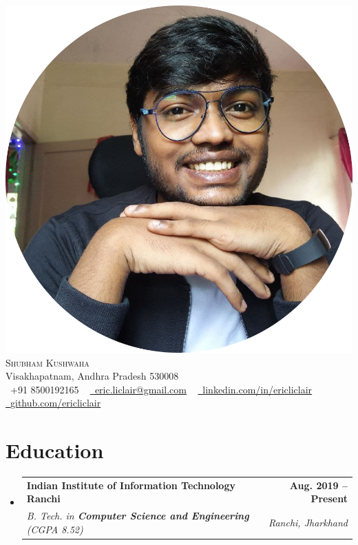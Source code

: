 \documentclass[letterpaper,11pt]{article}
\makeatletter
\newcommand{\resumeSubheading}[4]{
  \vspace{-2pt}\item
    \begin{tabular*}{1.0\textwidth}[t]{l@{\extracolsep{\fill}}r}
      \textbf{#1} & \textbf{\small #2} \\
      \textit{\small#3} & \textit{\small #4} \\
    \end{tabular*}\vspace{-7pt}
}
\newcommand{\resumeSubHeadingListStart}{\begin{itemize}[leftmargin=0.0in, label={}]}
\newcommand{\resumeSubHeadingListEnd}{\end{itemize}}
\makeatother
\begin{document}

\begin{center}
    {\includegraphics[scale=0.05]{images/profile.png}}\\ 
    {\Huge \scshape Shubham Kushwaha} \\ \vspace{1pt}
    Visakhapatnam, Andhra Pradesh 530008 \\ \vspace{1pt}
    \small \raisebox{-0.1\height}\faPhone\ +91 8500192165 ~ \href{mailto:eric.liclair@gmail.com}{\raisebox{-0.2\height}\faEnvelope\  \underline{eric.liclair@gmail.com}} ~ 
    \href{https://linkedin.com/in//}{\raisebox{-0.2\height}\faLinkedin\ \underline{linkedin.com/in/ericliclair}}  ~
    \href{https://github.com/}{\raisebox{-0.2\height}\faGithub\ \underline{github.com/ericliclair}}
    \vspace{-8pt}
\end{center}


\section{Education}
  \resumeSubHeadingListStart
    \resumeSubheading
      {Indian Institute of Information Technology Ranchi}{Aug. 2019 -- Present}
      {B. Tech. in \textbf{Computer Science and Engineering} (CGPA 8.52)}{Ranchi, Jharkhand}
  \resumeSubHeadingListEnd
\end{document}
